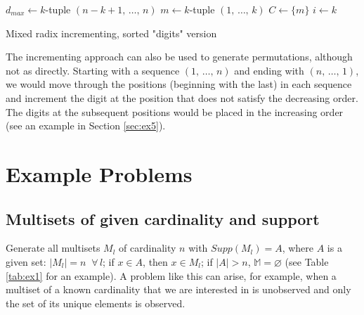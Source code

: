 \documentclass[11pt]{article}
\begin{document}
\begin{algorithm}[H] \label{alg:mirsaS}

  \BlankLine
  $d_{max} \gets k$-tuple $(n - k + 1, \, \dotsc, \, n)$\;
  $m \gets k$-tuple $(1, \, \dotsc, \, k)$\;
  $C \gets \{m\}$
  $i \gets k$\;
  \caption{Mixed radix incrementing, sorted "digits" version}
\end{algorithm}  

\vspace{5mm}
The incrementing approach can also be used to generate permutations, although not as directly. Starting with a sequence $(1, \, \dotsc, \, n)$ and ending with $(n, \, \dotsc, \, 1)$, we would move through the positions (beginning with the last) in each sequence and increment the digit at the position that does not satisfy the decreasing order. The digits at the subsequent positions would be placed in the increasing order (see an example in Section \ref{sec:ex5}). 

\section{Example Problems}


\subsection{Multisets of given cardinality and support} \label{sec:ex1}

Generate all multisets $M_l$ of cardinality $n$ with $Supp(M_l) = A$, where $A$ is a given set: $|M_l| = n \;\; \forall \, l$; if $x \in A$, then $x \in M_l$; if $|A| > n$, $\mathbb{M} = \varnothing$ (see Table \ref{tab:ex1} for an example). A problem like this can arise, for example, when a multiset of a known cardinality that we are interested in is unobserved and only the set of its unique elements is observed. \\
\end{document}
